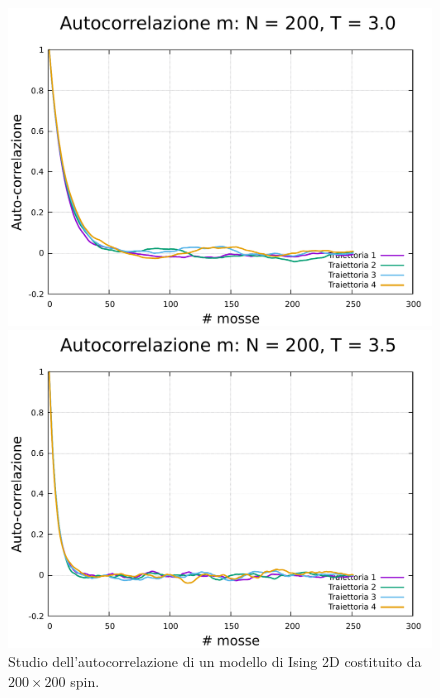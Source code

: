 \begin{figure}[htbp]
    \begin{minipage}{0.45\textwidth}  
        \centering
        \includegraphics[page=1, width=\textwidth]{Immagini/simIsing2D/metro/tcorr/auto_200_3.0.pdf}
        \caption{$T\,=\,3.0$}
      \end{minipage}\hfill
      \begin{minipage}{0.45\textwidth}  
        \centering
        \includegraphics[page=1, width=\textwidth]{Immagini/simIsing2D/metro/tcorr/auto_200_3.5.pdf}
        \caption{$T\,=\,3.5$}
    \end{minipage}

    \caption{Studio dell'autocorrelazione di un modello di Ising 2D costituito da $200 \times 200$ spin.}
\end{figure}

